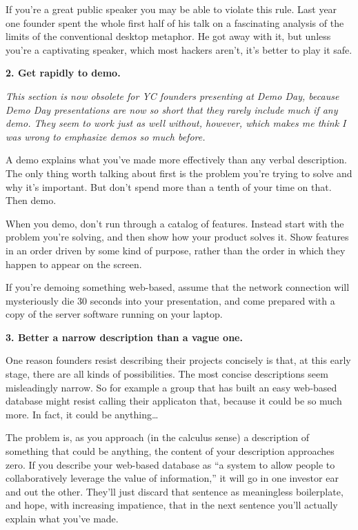 \documentclass[12pt]{book}
\begin{document}
If you're a great public speaker you may be able to violate this rule.
Last year one founder spent the whole first half of his talk on a
fascinating analysis of the limits of the conventional desktop metaphor.
He got away with it, but unless you're a captivating speaker, which most
hackers aren't, it's better to play it safe.

\textbf{2. Get rapidly to demo.}

\emph{This section is now obsolete for YC founders presenting at Demo
Day, because Demo Day presentations are now so short that they rarely
include much if any demo. They seem to work just as well without,
however, which makes me think I was wrong to emphasize demos so much
before.}

A demo explains what you've made more effectively than any verbal
description. The only thing worth talking about first is the problem
you're trying to solve and why it's important. But don't spend more than
a tenth of your time on that. Then demo.

When you demo, don't run through a catalog of features. Instead start
with the problem you're solving, and then show how your product solves
it. Show features in an order driven by some kind of purpose, rather
than the order in which they happen to appear on the screen.

If you're demoing something web-based, assume that the network
connection will mysteriously die 30 seconds into your presentation, and
come prepared with a copy of the server software running on your laptop.

\textbf{3. Better a narrow description than a vague one.}

One reason founders resist describing their projects concisely is that,
at this early stage, there are all kinds of possibilities. The most
concise descriptions seem misleadingly narrow. So for example a group
that has built an easy web-based database might resist calling their
applicaton that, because it could be so much more. In fact, it could be
anything\ldots{}

The problem is, as you approach (in the calculus sense) a description of
something that could be anything, the content of your description
approaches zero. If you describe your web-based database as ``a system
to allow people to collaboratively leverage the value of information,''
it will go in one investor ear and out the other. They'll just discard
that sentence as meaningless boilerplate, and hope, with increasing
impatience, that in the next sentence you'll actually explain what
you've made.
\end{document}
